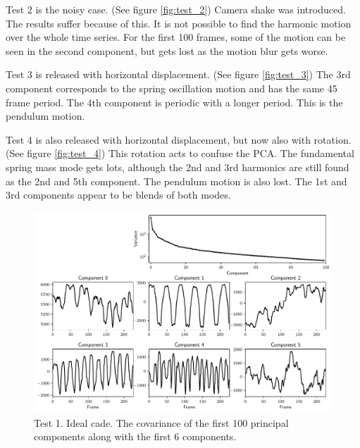 \documentclass{article}
\begin{document}
    Test 2 is the noisy case. (See figure \ref{fig:test_2}) Camera shake was
    introduced. The results suffer because of this. It is not possible to find
    the harmonic motion over the whole time series. For the first 100 frames,
    some of the motion can be seen in the second component, but gets lost as the
    motion blur gets worse.

    Test 3 is released with horizontal displacement. (See figure 
    \ref{fig:test_3}) The 3rd component corresponds to the spring oscillation
    motion and has the same 45 frame period. The 4th component is periodic with
    a longer period. This is the pendulum motion.

    Test 4 is also released with horizontal displacement, but now also with
    rotation. (See figure \ref{fig:test_4}) This rotation acts to confuse the
    PCA. The fundamental spring mass mode gets lots, although the 2nd and 3rd
    harmonics are still found as the 2nd and 5th component. The pendulum motion
    is also lost. The 1st and 3rd components appear to be blends of both modes.

    \begin{figure}[p]
        \includegraphics[width=\textwidth]{PCA_1.pdf}
        \caption{Test 1. Ideal cade. The covariance of the first 100 principal
        components along with the first 6 components. \label{fig:test_1}}
    \end{figure}
\end{document}

